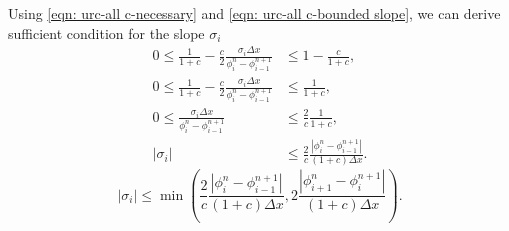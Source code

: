 \documentclass[../thesis.tex]{subfiles}
\begin{document}
Using \eqref{eqn: urc-all c-necessary} and \eqref{eqn: urc-all c-bounded slope}, we can derive sufficient condition for the slope \(\sigma_{i}\)
\begin{equation}\label{eqn: urc-all c- sufficient}
    \begin{split}
        0
        \leq
        \frac{1}{1+c}
        -\frac{c}{2}
        \frac{\sigma_{i}\Delta x}
        {\phi_{i}^{n} - \phi_{i-1}^{n+1}}
        &\leq
        1 - \frac{c}{1+c},
        \\
        0
        \leq
        \frac{1}{1+c}
        -\frac{c}{2}
        \frac{\sigma_{i}\Delta x}
        {\phi_{i}^{n} - \phi_{i-1}^{n+1}}
        &\leq
        \frac{1}{1+c},
        \\
        0
        \leq
        \frac{\sigma_{i}\Delta x}
        {\phi_{i}^{n} - \phi_{i-1}^{n+1}}
        &\leq
        \frac{2}{c}
        \frac{1}{1+c},
        \\
        |\sigma_{i}|
        &\leq
        \frac{2}{c}
        \frac{|\phi_{i}^{n} - \phi_{i-1}^{n+1}|}
        {(1+c)\Delta x}.
    \end{split}
\end{equation}
\begin{equation}
    |\sigma_{i}|
    \leq
    \min \left(
        \frac{2}{c}
        \frac{|\phi_{i}^{n} - \phi_{i-1}^{n+1}|}
        {(1+c)\Delta x},
        2\frac{|\phi_{i+1}^{n} - \phi_{i}^{n+1}|}
        {(1+c)\Delta x}
    \right).
\end{equation}
\end{document}
